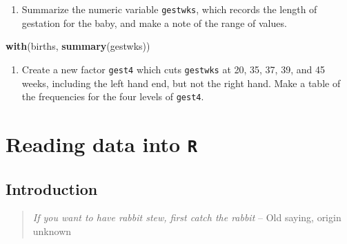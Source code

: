 \documentclass[
]{book}
\newenvironment{Shaded}{\begin{snugshade}}{\end{snugshade}}
\newcommand{\AttributeTok}[1]{\textcolor[rgb]{0.13,0.29,0.53}{#1}}
\newcommand{\DecValTok}[1]{\textcolor[rgb]{0.00,0.00,0.81}{#1}}
\newcommand{\FunctionTok}[1]{\textcolor[rgb]{0.13,0.29,0.53}{\textbf{#1}}}
\newcommand{\NormalTok}[1]{#1}
\newcommand{\OtherTok}[1]{\textcolor[rgb]{0.56,0.35,0.01}{#1}}
\newcommand{\SpecialCharTok}[1]{\textcolor[rgb]{0.81,0.36,0.00}{\textbf{#1}}}
\providecommand{\tightlist}{%
  \setlength{\itemsep}{0pt}\setlength{\parskip}{0pt}}
\begin{document}
\begin{enumerate}
\def\labelenumi{\arabic{enumi}.}
\tightlist
\item
  Summarize the numeric variable \texttt{gestwks}, which records the
  length of gestation for the baby, and make a note of the range of
  values.
\end{enumerate}

\begin{Shaded}
\begin{Highlighting}[]
\FunctionTok{with}\NormalTok{(births, }\FunctionTok{summary}\NormalTok{(gestwks))}
\end{Highlighting}
\end{Shaded}

\begin{enumerate}
\def\labelenumi{\arabic{enumi}.}
\setcounter{enumi}{1}
\tightlist
\item
  Create a new factor \texttt{gest4} which cuts \texttt{gestwks} at 20,
  35, 37, 39, and 45 weeks, including the left hand end, but not the
  right hand. Make a table of the frequencies for the four levels of \texttt{gest4}.
\end{enumerate}

\begin{Shaded}
\end{Shaded}

\chapter{\texorpdfstring{Reading data into \texttt{R}}{Reading data into R}}\label{reading-data-into-r}

\section{Introduction}\label{introduction}

\begin{quote}
\emph{If you want to have rabbit stew, first catch the rabbit} -- Old saying, origin unknown
\end{quote}
\end{document}
